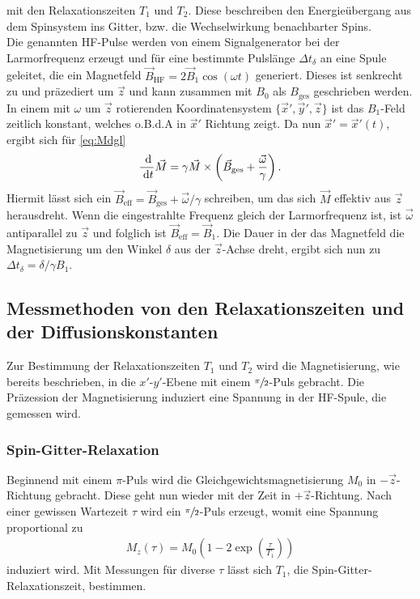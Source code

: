 mit den Relaxationszeiten $T_1$ und $T_2$. Diese beschreiben den Energieübergang aus dem Spinsystem ins Gitter, bzw. die Wechselwirkung
benachbarter Spins. \\
\noindent Die genannten HF-Pulse werden von einem Signalgenerator bei der Larmorfrequenz erzeugt und für eine bestimmte Pulslänge 
$\Delta t_\delta$ an eine Spule geleitet, die ein Magnetfeld $\vec B_\text{HF} = 2\vec B_1 \cos(\omega t)$ generiert. Dieses ist senkrecht
zu und präzediert um $\vec z$ und kann zusammen mit $B_0$ als $B_\text{ges}$ geschrieben werden. In einem mit $\omega$ um $\vec z$ 
rotierenden Koordinatensystem $\{\vec x', \vec y', \vec z\}$ ist das $B_1$-Feld zeitlich konstant, welches o.B.d.A in $\vec x'$ Richtung zeigt. 
Da nun $\vec x' = \vec x'(t)$, ergibt sich für 
\eqref{eq:Mdgl}
\begin{align}
 \frac{\; \mathrm{d} }{\; \mathrm{d} t}\vec M = \gamma \vec M  \times \left(\vec B_\text{ges} + \frac{\vec \omega}{\gamma}\right).
\end{align}
Hiermit lässt sich ein $\vec B_\text{eff} = \vec B_\text{ges} + \vec\omega/\gamma$ schreiben, um das sich $\vec M$ effektiv aus $\vec z$ herausdreht. Wenn
die eingestrahlte Frequenz gleich der Larmorfrequenz ist, ist $\vec \omega$ antiparallel zu $\vec z$ und folglich ist $\vec B_\text{eff}=\vec B_1$.
Die Dauer in der das Magnetfeld die Magnetisierung um den Winkel $\delta$ aus der $\vec z$-Achse dreht, ergibt sich nun zu
$\Delta t_\delta = \delta/\gamma B_1$.

\subsection{Messmethoden von den Relaxationszeiten und der Diffusionskonstanten}
Zur Bestimmung der Relaxationszeiten $T_1$ und $T_2$ wird die Magnetisierung, wie bereits beschrieben, in die $x'$-$y'$-Ebene mit einem 
$\sfrac{\pi}{2}$-Puls gebracht. Die Präzession der Magnetisierung induziert eine Spannung in der HF-Spule, die gemessen wird.
\subsubsection{Spin-Gitter-Relaxation}
Beginnend mit einem $\pi$-Puls wird die Gleichgewichtsmagnetisierung $M_0$ in $-\vec z$-Richtung gebracht. Diese geht nun wieder mit der Zeit 
in $+\vec z$-Richtung. Nach einer gewissen Wartezeit $\tau$ wird ein $\sfrac{\pi}{2}$-Puls erzeugt, womit eine Spannung proportional
zu
\begin{align}
 M_z(\tau) = M_0\left(1-2\exp\left(\frac{\tau}{T_1}\right)\right)
 \label{eq:T1}
\end{align}
induziert wird. Mit Messungen für diverse $\tau$ lässt sich $T_1$, die Spin-Gitter-Relaxationszeit, bestimmen.

